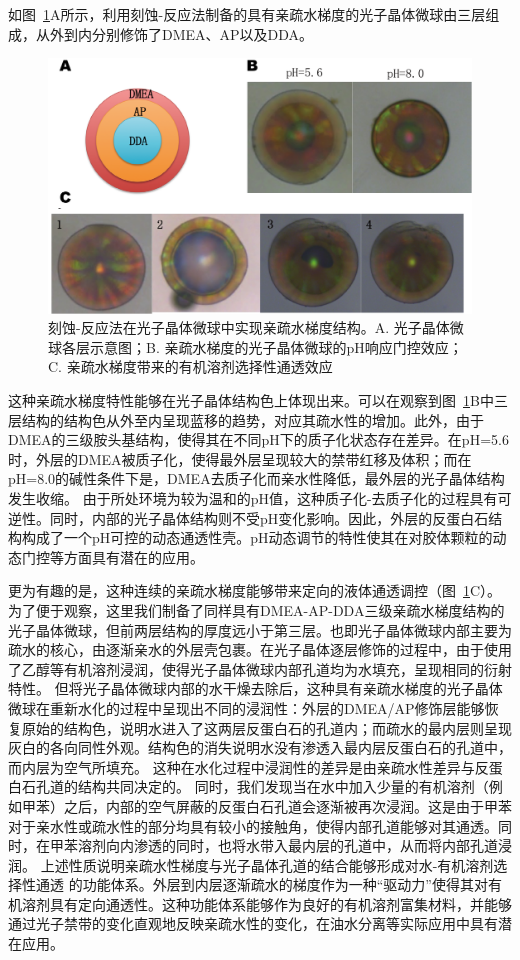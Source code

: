 如图~\ref{fig:CCB-gradient}A所示，利用刻蚀-反应法制备的具有亲疏水梯度的光子晶体微球由三层组成，从外到内分别修饰了DMEA、AP以及DDA。
\begin{figure}[htbp]
  \centering
  \includegraphics[width=\linewidth]{figures/ch5/CCB-gradient.png}
  \caption{刻蚀-反应法在光子晶体微球中实现亲疏水梯度结构。A. 光子晶体微球各层示意图；B. 亲疏水梯度的光子晶体微球的pH响应门控效应；C. 亲疏水梯度带来的有机溶剂选择性通透效应}
  \label{fig:CCB-gradient}
\end{figure}
这种亲疏水梯度特性能够在光子晶体结构色上体现出来。可以在观察到图~\ref{fig:CCB-gradient}B中三层结构的结构色从外至内呈现蓝移的趋势，对应其疏水性的增加。此外，由于DMEA的三级胺头基结构，使得其在不同pH下的质子化状态存在差异。在pH=5.6时，外层的DMEA被质子化，使得最外层呈现较大的禁带红移及体积；而在pH=8.0的碱性条件下是，DMEA去质子化而亲水性降低，最外层的光子晶体结构发生收缩。
由于所处环境为较为温和的pH值，这种质子化-去质子化的过程具有可逆性\cite{Siegel1988PhDependent}。同时，内部的光子晶体结构则不受pH变化影响。因此，外层的反蛋白石结构构成了一个pH可控的动态通透性壳。pH动态调节的特性使其在对胶体颗粒的动态门控等方面具有潜在的应用\cite{Yang2013MaleimideContaining}。

更为有趣的是，这种连续的亲疏水梯度能够带来定向的液体通透调控（图~\ref{fig:CCB-gradient}C）。为了便于观察，这里我们制备了同样具有DMEA-AP-DDA三级亲疏水梯度结构的光子晶体微球，但前两层结构的厚度远小于第三层。也即光子晶体微球内部主要为疏水的核心，由逐渐亲水的外层壳包裹。在光子晶体逐层修饰的过程中，由于使用了乙醇等有机溶剂浸润，使得光子晶体微球内部孔道均为水填充，呈现相同的衍射特性。
但将光子晶体微球内部的水干燥去除后，这种具有亲疏水梯度的光子晶体微球在重新水化的过程中呈现出不同的浸润性：外层的DMEA/AP修饰层能够恢复原始的结构色，说明水进入了这两层反蛋白石的孔道内；而疏水的最内层则呈现灰白的各向同性外观。结构色的消失说明水没有渗透入最内层反蛋白石的孔道中，而内层为空气所填充。
这种在水化过程中浸润性的差异是由亲疏水性差异与反蛋白石孔道的结构共同决定的\cite{Burgess2012Wetting}。
同时，我们发现当在水中加入少量的有机溶剂（例如甲苯）之后，内部的空气屏蔽的反蛋白石孔道会逐渐被再次浸润。这是由于甲苯对于亲水性或疏水性的部分均具有较小的接触角，使得内部孔道能够对其通透。同时，在甲苯溶剂向内渗透的同时，也将水带入最内层的孔道中，从而将内部孔道浸润。
上述性质说明亲疏水性梯度与光子晶体孔道的结合能够形成对水-有机溶剂选择性通透
的功能体系。外层到内层逐渐疏水的梯度作为一种“驱动力”使得其对有机溶剂具有定向通透性。这种功能体系能够作为良好的有机溶剂富集材料，并能够通过光子禁带的变化直观地反映亲疏水性的变化，在油水分离等实际应用中具有潜在应用。

